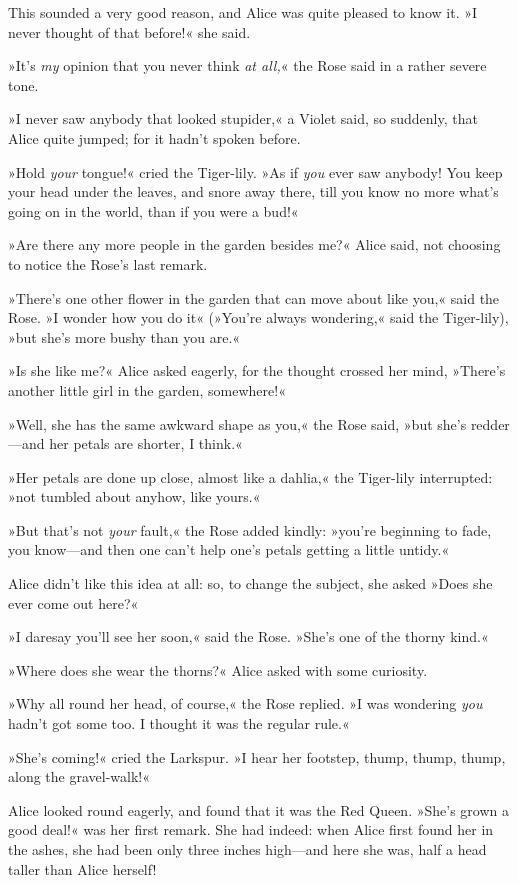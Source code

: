 This sounded a very good reason, and Alice was quite pleased to know it. »I never thought of that before!« she said.

»It's \textit{my} opinion that you never think \textit{at all,}« the Rose said in a rather severe tone.

»I never saw anybody that looked stupider,« a Violet said, so suddenly, that Alice quite jumped; for it hadn't spoken before.

»Hold \textit{your} tongue!« cried the Tiger-lily. »As if \textit{you} ever saw anybody! You keep your head under the leaves, and snore away there, till you know no more what's going on in the world, than if you were a bud!«

»Are there any more people in the garden besides me?« Alice said, not choosing to notice the Rose's last remark.

»There's one other flower in the garden that can move about like you,« said the Rose. »I wonder how you do it\longdash« (»You're always wondering,« said the Tiger-lily), »but she's more bushy than you are.«

»Is she like me?« Alice asked eagerly, for the thought crossed her mind, »There's another little girl in the garden, somewhere!«

»Well, she has the same awkward shape as you,« the Rose said, »but she's redder—and her petals are shorter, I think.«

»Her petals are done up close, almost like a dahlia,« the Tiger-lily interrupted: »not tumbled about anyhow, like yours.«

»But that's not \textit{your} fault,« the Rose added kindly: »you're beginning to fade, you know—and then one can't help one's petals getting a little untidy.«

Alice didn't like this idea at all: so, to change the subject, she asked »Does she ever come out here?«

»I daresay you'll see her soon,« said the Rose. »She's one of the thorny kind.«

»Where does she wear the thorns?« Alice asked with some curiosity.

»Why all round her head, of course,« the Rose replied. »I was wondering \textit{you} hadn't got some too. I thought it was the regular rule.«

»She's coming!« cried the Larkspur. »I hear her footstep, thump, thump, thump, along the gravel-walk!«


Alice looked round eagerly, and found that it was the Red Queen. \label{white1} »She's grown a good deal!« was her first remark. She had indeed: when Alice first found her in the ashes, she had been only three inches high—and here she was, half a head taller than Alice herself!

